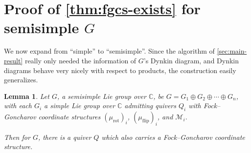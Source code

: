 \documentclass{amsart}
\theoremstyle{plain}
\newtheorem{lemma}[theorem]{Lemma}
\theoremstyle{definition}
\theoremstyle{remark}
\newcommand{\conftoquiv}{\mathcal{M}}
\newcommand{\muflip}{{\mu_{\text{flip}}}}
\newcommand{\murot}{{\mu_{\text{rot}}}}
\begin{document}
  \section{Proof of \cref{thm:fgcs-exists} for semisimple
    \texorpdfstring{$G$}{G}}

  \label{sec:products}

  We now expand from ``simple'' to ``semisimple''. Since the algorithm
  of \cref{sec:main-result} really only needed the information of $G$'s
  Dynkin diagram, and Dynkin diagrams behave very nicely with respect to
  products, the construction easily generalizes.

  \begin{lemma}
    \label{lem:fgcs-exists-for-products}
    Let $G$, a semisimple Lie group over $\mathbb{C}$, be $G = G_1
    \oplus G_2 \oplus \dotsb \oplus G_n$, with each $G_i$ a simple Lie
    group over $\mathbb{C}$ admitting quivers $Q_i$ with Fock--Goncharov
    coordinate structures $(\murot)_i$, $(\muflip)_i$, and
    $\conftoquiv_i$.

    Then for $G$, there is a quiver $Q$ which also carries a
    Fock--Goncharov coordinate structure.
  \end{lemma}
\end{document}
